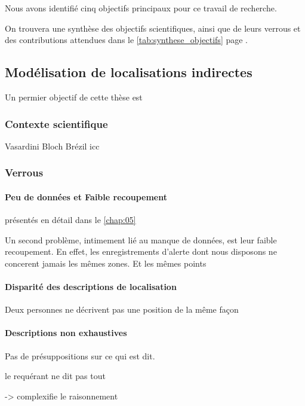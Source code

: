 Nous avons identifié cinq objectifs principaux pour ce travail de
recherche.

On trouvera une synthèse des objectifs scientifiques, ainsi que de
leurs verrous et des contributions attendues dans le
\autoref{tab:synthese_objectifs} page
\pageref{tab:synthese_objectifs}.

\subsection{Modélisation de localisations indirectes}
\label{subsec:2-1-1}

Un permier objectif de cette thèse est 

\subsubsection{Contexte scientifique}

Vasardini
Bloch
Brézil icc

\subsubsection{Verrous}

\paragraph{Peu de données et Faible recoupement}

présentés en détail dans le \autoref{chap:05}

Un second problème, intimement lié au manque de données, est leur
faible recoupement. En effet, les enregistrements d'alerte dont nous
disposons ne concerent jamais les mêmes zones. Et les mêmes points


\paragraph{Disparité des descriptions de localisation}

Deux personnes ne décrivent pas une position de la même façon

\paragraph{Descriptions non exhaustives}

Pas de présuppositions sur ce qui est dit.

le requérant ne dit pas tout

-> complexifie le raisonnement


